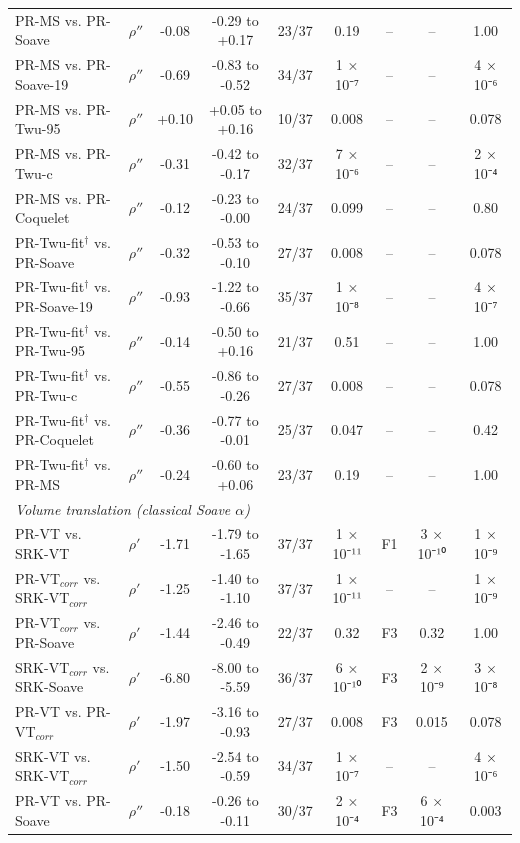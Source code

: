 \begin{table}[H]
\begin{tabular}{llccccccc}
PR-MS vs. PR-Soave & $\rho''$ & -0.08 & -0.29 to +0.17 & 23/37 & 0.19 & -- & -- & 1.00 \\
PR-MS vs. PR-Soave-19 & $\rho''$ & -0.69 & -0.83 to -0.52 & 34/37 & 1 × 10⁻⁷ & -- & -- & 4 × 10⁻⁶ \\
PR-MS vs. PR-Twu-95 & $\rho''$ & +0.10 & +0.05 to +0.16 & 10/37 & 0.008 & -- & -- & 0.078 \\
PR-MS vs. PR-Twu-c & $\rho''$ & -0.31 & -0.42 to -0.17 & 32/37 & 7 × 10⁻⁶ & -- & -- & 2 × 10⁻⁴ \\
PR-MS vs. PR-Coquelet & $\rho''$ & -0.12 & -0.23 to -0.00 & 24/37 & 0.099 & -- & -- & 0.80 \\
PR-Twu-fit$^{\dagger}$ vs. PR-Soave & $\rho''$ & -0.32 & -0.53 to -0.10 & 27/37 & 0.008 & -- & -- & 0.078 \\
PR-Twu-fit$^{\dagger}$ vs. PR-Soave-19 & $\rho''$ & -0.93 & -1.22 to -0.66 & 35/37 & 1 × 10⁻⁸ & -- & -- & 4 × 10⁻⁷ \\
PR-Twu-fit$^{\dagger}$ vs. PR-Twu-95 & $\rho''$ & -0.14 & -0.50 to +0.16 & 21/37 & 0.51 & -- & -- & 1.00 \\
PR-Twu-fit$^{\dagger}$ vs. PR-Twu-c & $\rho''$ & -0.55 & -0.86 to -0.26 & 27/37 & 0.008 & -- & -- & 0.078 \\
PR-Twu-fit$^{\dagger}$ vs. PR-Coquelet & $\rho''$ & -0.36 & -0.77 to -0.01 & 25/37 & 0.047 & -- & -- & 0.42 \\
PR-Twu-fit$^{\dagger}$ vs. PR-MS & $\rho''$ & -0.24 & -0.60 to +0.06 & 23/37 & 0.19 & -- & -- & 1.00 \\
\multicolumn{9}{l}{\emph{Volume translation (classical Soave $\alpha$)}} \\
PR-VT vs. SRK-VT & $\rho'$ & -1.71 & -1.79 to -1.65 & 37/37 & 1 × 10⁻¹¹ & F1 & 3 × 10⁻¹⁰ & 1 × 10⁻⁹ \\
PR-VT$_{corr}$ vs. SRK-VT$_{corr}$ & $\rho'$ & -1.25 & -1.40 to -1.10 & 37/37 & 1 × 10⁻¹¹ & -- & -- & 1 × 10⁻⁹ \\
PR-VT$_{corr}$ vs. PR-Soave & $\rho'$ & -1.44 & -2.46 to -0.49 & 22/37 & 0.32 & F3 & 0.32 & 1.00 \\
SRK-VT$_{corr}$ vs. SRK-Soave & $\rho'$ & -6.80 & -8.00 to -5.59 & 36/37 & 6 × 10⁻¹⁰ & F3 & 2 × 10⁻⁹ & 3 × 10⁻⁸ \\
PR-VT vs. PR-VT$_{corr}$ & $\rho'$ & -1.97 & -3.16 to -0.93 & 27/37 & 0.008 & F3 & 0.015 & 0.078 \\
SRK-VT vs. SRK-VT$_{corr}$ & $\rho'$ & -1.50 & -2.54 to -0.59 & 34/37 & 1 × 10⁻⁷ & -- & -- & 4 × 10⁻⁶ \\
PR-VT vs. PR-Soave & $\rho''$ & -0.18 & -0.26 to -0.11 & 30/37 & 2 × 10⁻⁴ & F3 & 6 × 10⁻⁴ & 0.003 \\

\end{tabular}
\end{table}
